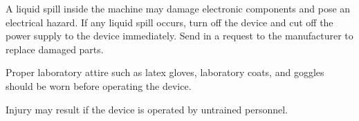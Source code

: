 A liquid spill inside the machine may damage electronic components and pose an electrical hazard.
If any liquid spill occurs, turn off the device and cut off the power supply to the device immediately. Send in a request to the manufacturer to replace damaged parts.

Proper laboratory attire such as latex gloves, laboratory coats, and goggles should be worn before operating the device. 

Injury may result if the device is operated by untrained personnel. 


